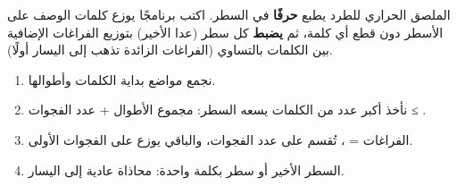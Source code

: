 \begin{statement}
الملصق الحراري للطرد يطبع \textbf{ حرفًا} في السطر. اكتب برنامجًا يوزع كلمات الوصف على الأسطر دون قطع أي كلمة، ثم \textbf{يضبط} كل سطر (عدا الأخير) بتوزيع الفراغات الإضافية بين الكلمات بالتساوي (الفراغات الزائدة تذهب إلى اليسار أولًا).
\end{statement}
\begin{stepsbox}\begin{enumerate}
\item نجمع مواضع بداية الكلمات وأطوالها.
\item نأخذ أكبر عدد من الكلمات يسعه السطر: مجموع الأطوال + عدد الفجوات ≤ .
\item الفراغات = ، تُقسم على عدد الفجوات، والباقي يوزع على الفجوات الأولى.
\item السطر الأخير أو سطر بكلمة واحدة: محاذاة عادية إلى اليسار.
\end{enumerate}\end{stepsbox}
